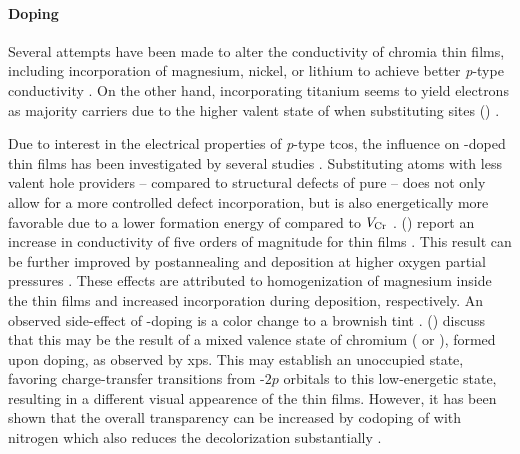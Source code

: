 \paragraph{Doping}
Several attempts have been made to alter the conductivity of chromia thin films, including incorporation of magnesium, nickel, or lithium to achieve better \textit{p}-type conductivity
    \cite{farrell2015}.
On the other hand, incorporating titanium seems to yield electrons as majority carriers 
    \cite{holt1994}
due to the higher valent state of  when substituting  sites ()
    \cite{kofstad1980}.

Due to interest in the electrical properties of \textit{p}-type \glspl{tco}, the influence on -doped  thin films has been investigated by several studies
    \cite{holt1994,uekawa1996,arca2011,arca2013,farrell2015,arca2017,kehoe2016}.
Substituting  atoms with less valent hole providers -- compared to structural defects of pure  -- does not only allow for a more controlled defect incorporation, but is also energetically more favorable due to a lower formation energy of  compared to $V_{\ce{Cr}}$
    \cite{kehoe2016}.
\citeauthor{uekawa1996} (\citeyear{uekawa1996}) report an increase in conductivity of five orders of magnitude for  thin films
    \cite{uekawa1996}.
This result can be further improved by postannealing
    \cite{farrell2015}
and deposition at higher oxygen partial pressures
    \cite{holt1994,farrell2015}.
These effects are attributed to homogenization of magnesium inside the thin films and increased  incorporation during deposition, respectively.
An observed side-effect of -doping is a color change to a brownish tint
    \cite{uekawa1996,arca2013}.
 (\citeyear{uekawa1996}) discuss that this may be the result of a mixed valence state of chromium ( or ), formed upon doping, as observed by \gls{xps}.
This may establish an unoccupied state, favoring charge-transfer transitions from -$2p$ orbitals to this low-energetic state, resulting in a different visual appearence of the thin films.
However, it has been shown that the overall transparency can be increased by codoping of  with nitrogen which also reduces the decolorization substantially
    \cite{arca2011,arca2013}.